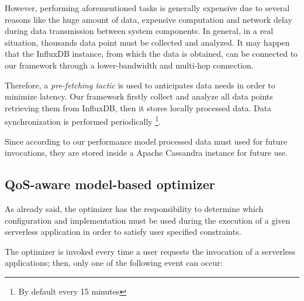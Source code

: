\documentclass[12pt,a4paper]{report}
\begin{document}
However, performing aforementioned tasks is generally expensive due to several reasons like the huge amount of data, expensive computation and network delay during data transmission between system components. In general, in a real situation, thousands data point must be collected and analyzed. It may happen that the InfluxDB instance, from which the data is obtained, can be connected to our framework through a lower-bandwidth and multi-hop connection. 

Therefore, a \textit{pre-fetching tactic} is used to anticipates data needs in order to minimize latency\cite{Tactics}. Our framework firstly collect and analyze all data points retrieving them from InfluxDB, then it stores locally processed data. Data synchronization is performed periodically \footnote{By default every 15 minutes}.

Since according to our performance model processed data must used for future invocations, they are stored inside a Apache Cassandra instance for future use.
	
\subsection{QoS-aware model-based optimizer}
	
As already said, the optimizer has the responsibility to determine which configuration and implementation must be used during the execution of a given serverless application in order to satisfy user specified constraints.

The optimizer is invoked every time a user requests the invocation of a serverless applications; then, only one of the following event can occur:
\end{document}
